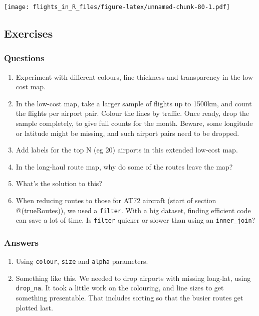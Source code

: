 \documentclass[
]{book}
\providecommand{\tightlist}{%
  \setlength{\itemsep}{0pt}\setlength{\parskip}{0pt}}
\begin{document}
\texttt{[image: flights\_in\_R\_files/figure-latex/unnamed-chunk-80-1.pdf]}

\hypertarget{exercises-7}{%
\subsection{Exercises}\label{exercises-7}}

\hypertarget{questions-11}{%
\subsubsection{Questions}\label{questions-11}}

\begin{enumerate}
\def\labelenumi{\arabic{enumi})}
\tightlist
\item
  Experiment with different colours, line thickness and transparency in the low-cost map.
\item
  In the low-cost map, take a larger sample of flights up to 1500km, and count the flights per airport pair. Colour the lines by traffic. Once ready, drop the sample completely, to give full counts for the month. Beware, some longitude or latitude might be missing, and such airport pairs need to be dropped.
\item
  Add labels for the top N (eg 20) airports in this extended low-cost map.
\item
  In the long-haul route map, why do some of the routes leave the map?
\item
  What's the solution to this?
\item
  When reducing routes to those for AT72 aircraft (start of section @(trueRoutes)), we used a \texttt{filter}. With a big dataset, finding efficient code can save a lot of time. Is \texttt{filter} quicker or slower than using an \texttt{inner\_join}?
\end{enumerate}

\hypertarget{answers-11}{%
\subsubsection{Answers}\label{answers-11}}

\begin{enumerate}
\def\labelenumi{\arabic{enumi})}
\tightlist
\item
  Using \texttt{colour}, \texttt{size} and \texttt{alpha} parameters.
\item
  Something like this. We needed to drop airports with missing long-lat, using \texttt{drop\_na}. It took a little work on the colouring, and line sizes to get something presentable. That includes sorting so that the busier routes get plotted last.
\end{enumerate}
\end{document}
